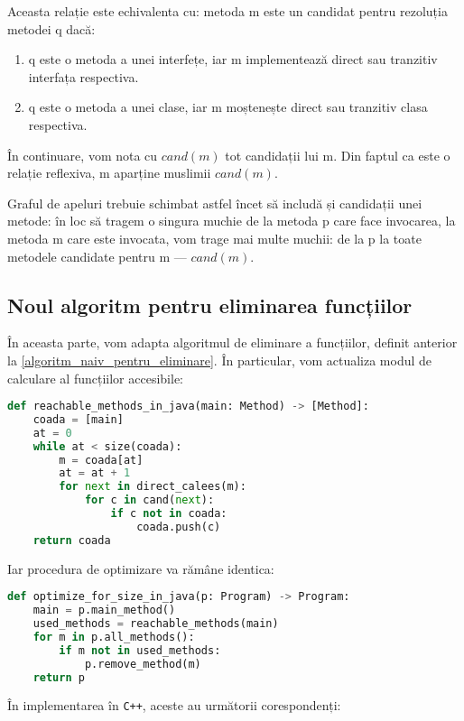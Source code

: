 Aceasta relație este echivalenta cu: metoda m este un candidat pentru rezoluția
metodei q dacă:
\begin{enumerate}
    \item q este o metoda a unei interfețe, iar m implementează direct sau
        tranzitiv interfața respectiva.
    \item q este o metoda a unei clase, iar m moștenește direct sau tranzitiv
        clasa respectiva.
\end{enumerate}

În continuare, vom nota cu $cand(m)$ tot candidații lui m. Din faptul ca este o
relație reflexiva, m aparține muslimii $cand(m)$.

Graful de apeluri trebuie schimbat astfel încet să includă și candidații unei
metode: în loc să tragem o singura muchie de la metoda p care face invocarea, la
metoda m care este invocata, vom trage mai multe muchii: de la p la toate
metodele candidate pentru m --- $cand(m)$.

\subsection{Noul algoritm pentru eliminarea funcțiilor}

În aceasta parte, vom adapta algoritmul de eliminare a funcțiilor, definit
anterior la \ref{algoritm_naiv_pentru_eliminare}.
În particular, vom actualiza modul de calculare al funcțiilor accesibile:

\begin{lstlisting}[language=Python]
def reachable_methods_in_java(main: Method) -> [Method]:
    coada = [main]
    at = 0
    while at < size(coada):
        m = coada[at]
        at = at + 1
        for next in direct_calees(m):
            for c in cand(next):
                if c not in coada:
                    coada.push(c)
    return coada
\end{lstlisting}


Iar procedura de optimizare va rămâne identica:

\begin{lstlisting}[language=Python]
def optimize_for_size_in_java(p: Program) -> Program:
    main = p.main_method()
    used_methods = reachable_methods(main)
    for m in p.all_methods():
        if m not in used_methods:
            p.remove_method(m)
    return p
\end{lstlisting}


În implementarea în \texttt{C++}, aceste au următorii corespondenți:


